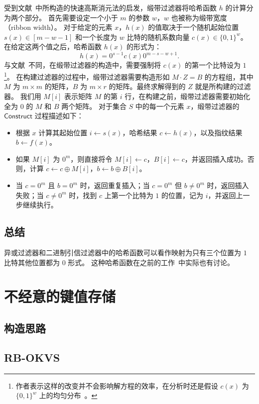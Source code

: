 受到文献~\cite{dietzfelbinger2019Efficient}中所构造的快速高斯消元法的启发，缎带过滤器将哈希函数 $h$ 的计算分为两个部分。
首先需要设定一个小于 $m$ 的参数 $w$，$w$ 也被称为缎带宽度 （ribbon width）。
对于给定的元素 $x$，$h(x)$ 的值取决于一个随机起始位置 $s(x)\in [m-w-1]$ 和一个长度为 $w$ 比特的随机系数向量 $c(x) \in \{0,1\}^w$。
在给定这两个值之后，哈希函数 $h(x)$ 的形式为：
\begin{equation}
  h(x) = 0^{s-1}c(x)0^{m-s-w+1}.
\end{equation}
与文献~\cite{dillinger2021ribbon}不同，在缎带过滤器的构造中，需要强制将 $c(x)$ 的第一个比特设为 $1$\footnote{作者表示这样的改变并不会影响解方程的效率，在分析时还是假设 $c(x)$ 为 $\{0,1\}^w$ 上的均匀分布~\cite{dillinger2021ribbon}。}。
在构建过滤器的过程中，缎带过滤器需要构造形如 $M \cdot Z = B$ 的方程组，其中 $M$ 为 $m\times m$ 的矩阵，$B$ 为 $m\times r$ 的矩阵。最终求解得到的 $Z$ 就是所构建的过滤器。
我们用 $M[i]$ 表示矩阵 $M$ 的第 $i$ 行，在构建之前，缎带过滤器需要初始化全为 $0$ 的 $M$ 和 $B$ 两个矩阵。
对于集合 $S$ 中的每一个元素 $x$，缎带过滤器的 $\mathsf{Construct}$ 过程描述如下：
\begin{itemize}
  \item 根据 $x$ 计算其起始位置 $i\gets s(x)$，哈希结果 $c \gets h(x)$，以及指纹结果 $b \gets f(x)$。
  \item 如果 $M[i]$ 为 $0^{m}$，则直接将令 $M[i] \gets c$，$B[i] \gets c$，并返回插入成功。否则，计算 $c \gets c \oplus M[i]$，$b \gets b \oplus B[i]$。
  \item 当 $c=0^{m}$ 且 $b = 0^{m}$ 时，返回重复插入；当 $c=0^{m}$ 但 $b \neq 0^{m}$ 时，返回插入失败；当 $c\neq 0^{m}$ 时，找到 $c$ 上第一个比特为 $1$ 的位置，记为 $i$，并返回上一步继续执行。
\end{itemize}

\subsection{总结}

异或过滤器和二进制引信过滤器中的哈希函数可以看作映射为只有三个位置为 $1$ 比特其他位置都为 $0$ 形式。
这种哈希函数在之前的工作~\cite{botelho2013Practical,genuzio2016Fast}中实际也有讨论。

\section{不经意的键值存储}

\subsection{构造思路}

\subsection{RB-OKVS}
